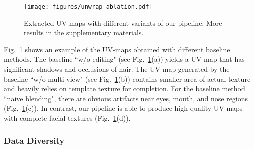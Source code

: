 \documentclass[10pt,twocolumn,letterpaper]{article}
\begin{document}
\begin{figure}[!t]
  \centering
   \texttt{[image: figures/unwrap\_ablation.pdf]}
   \caption{Extracted UV-maps with different variants of our pipeline. More results in the supplementary materials.}
   \label{fig:unwrap-ablation}
\end{figure}



Fig.~\ref{fig:unwrap-ablation} shows an example of the UV-maps obtained with different baseline methods. 
The baseline ``w/o editing"  (see Fig.~\ref{fig:unwrap-ablation}(a)) yields a UV-map that has significant shadows and occlusions of hair.
The UV-map generated by the baseline ``w/o multi-view" (see Fig.~\ref{fig:unwrap-ablation}(b)) contains smaller area of actual texture and heavily relies on template texture for completion.
For the baseline method ``naive blending", there are obvious artifacts near eyes, mouth, and nose regions (Fig.~\ref{fig:unwrap-ablation}(c)).
In contrast, our pipeline is able to produce high-quality UV-maps with complete facial textures (Fig.~\ref{fig:unwrap-ablation}(d)).


\vspace{-3mm}
\subsubsection{Data Diversity}
\vspace{-1mm}


\begin{table}[!t]
\caption{Quantitative evaluation on the diversity of the proposed dataset in terms of identity feature standard deviation, where all the values are divided by the value of FFHQ.  indicates that ID features are extracted from rendered face images.}
\small
\centering
{}
\label{tab:id-std}
\end{table} 
\end{document}
